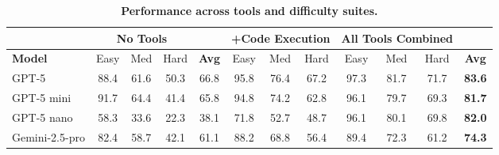 \documentclass{article} %
\theoremstyle{plain}
\theoremstyle{definition}
\newcommand{\rebuttal}[1]{{\color{RebuttalGreen}#1}}
\begin{document}
\begin{table}
\vspace{-1em}
\centering
\footnotesize
\begin{adjustbox}{width=0.70\textwidth,center}
\begin{tabular}{l|ccc|c|ccc|ccc|c}
\toprule
& \multicolumn{3}{c|}{\textbf{No Tools}} & & \multicolumn{3}{c|}{\rebuttal{\textbf{+Code Execution}}} & \multicolumn{3}{c|}{\textbf{All Tools Combined}} & \cellcolor{gray!15} \\
\midrule
\textbf{Model} & Easy & Med & Hard & \rebuttal{\textbf{Avg}} & \rebuttal{Easy} & \rebuttal{Med} & \rebuttal{Hard} & Easy & Med & Hard & \cellcolor{gray!15} \textbf{Avg} \\
\midrule
GPT-5         & 88.4 & 61.6 & 50.3 & \rebuttal{66.8} & \rebuttal{95.8} & \rebuttal{76.4} & \rebuttal{67.2} & 97.3 & 81.7 & 71.7 & \cellcolor{gray!15} \textbf{83.6} \\
GPT-5 mini    & 91.7 & 64.4 & 41.4 & \rebuttal{65.8} & \rebuttal{94.8} & \rebuttal{74.2} & \rebuttal{62.8} & 96.1 & 79.7 & 69.3 & \cellcolor{gray!15} \textbf{81.7} \\
GPT-5 nano    & 58.3 & 33.6 & 22.3 & \rebuttal{38.1} & \rebuttal{71.8} & \rebuttal{52.7} & \rebuttal{48.7} & 96.1 & 80.1 & 69.8 & \cellcolor{gray!15} \textbf{82.0} \\
\rebuttal{Gemini-2.5-pro} & \rebuttal{82.4} & \rebuttal{58.7} & \rebuttal{42.1} & \rebuttal{61.1} & \rebuttal{88.2} & \rebuttal{68.8} & \rebuttal{56.4} & \rebuttal{89.4} & \rebuttal{72.3} & \rebuttal{61.2} & \cellcolor{gray!15} \rebuttal{\textbf{74.3}} \\
\bottomrule
\end{tabular}
\end{adjustbox}
\caption{\rebuttal{\textbf{Performance across tools and difficulty suites.}}}
\label{tab:gpt5_accuracy}
\vspace{-1em}
\end{table}
\end{document}
